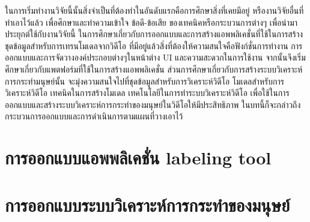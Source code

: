 ในการเริ่มทำงานวิจัยนี้นั้นสิ่งจำเป็นที่ต้องทำในอันดับแรกคือการศึกษาสิ่งที่เคยมีอยู่ หรืองานวิจัยอื่นที่ทำเอาไว้แล้ว
เพื่อศึกษาและทำความเข้าใจ ข้อดี-ข้อเสีย ของเทคนิคหรือกระบวนการต่างๆ เพื่อนำมาประยุกต์ใช้กับงานวิจัยนี้
ในการศึกษาเกี่ยวกับการออกแบบและการสร้างแอพพลิเคชั่นที่ใช้ในการสร้างชุดข้อมูลสำหรับการเทรนโมเดลจากวิดีโอ
ที่มีอยู่แล้วสิ่งที่ต้องให้ความสนใจคือฟังก์ชั่นการทำงาน การออกแบบและการจัดวางองค์ประกอบต่างๆในหน้าต่าง UI
และความสะดวกในการใช้งาน จากนั้นจึงเริ่มศึกษาเกี่ยวกับแพตฟอร์มที่ใช้ในการสร้างแอพพลิเคชั่น
ส่วนการศึกษาเกี่ยวกับการสร้างระบบวิเคราะห์การกระทำมนุษย์นั้น จะมุ่งความสนใจไปที่ชุดข้อมูลสำหรับการวิเคราะห์วิดีโอ
โมเดลสำหรับการวิเคราะห์วิดีโอ เทคนิคในการสร้างโมเดล เทคโนโลยีในการทำระบบวิเคราะห์วิดีโอ
เพื่อใช้ในการออกแบบและสร้างระบบวิเคราะห์การกระทำของมนุษย์ในวิดีโอให้มีประสิทธิภาพ
ในบทนี้ก็จะกล่าวถึงกระบวนการออกแบบและการดำเนินการตามแผนที่วางเอาไว้

\clearpage
\section{การออกแบบแอพพลิเคชั่น labeling tool}


\clearpage
\section{การออกแบบระบบวิเคราะห์การกระทำของมนุษย์}
